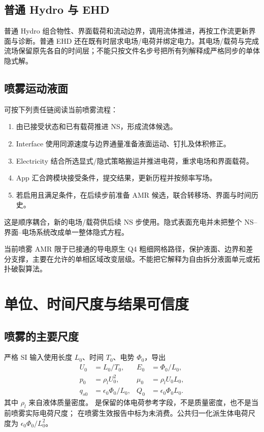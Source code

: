 \documentclass[a4paper,11pt]{article}
\begin{document}
\subsection{普通 Hydro 与 EHD}
普通 Hydro 组合物性、界面载荷和流动边界，调用流体推进，再按工作流更新界面与诊断。普通 EHD 还在既有时层求电场/电荷并绑定电力。其电场/载荷与完成流场保留原先各自的时间层；不能只按文件名步号把所有列解释成严格同步的单体隐式解。

\subsection{喷雾运动液面}
可按下列责任链阅读当前喷雾流程：
\begin{enumerate}
\item 由已接受状态和已有载荷推进 NS，形成流体候选。
\item Interface 使用同源速度与边界通量准备液面运动、钉扎及体积修正。
\item Electricity 结合所选显式/隐式策略搬运并推进电荷，重求电场和界面载荷。
\item App 汇合跨模块接受条件，提交结果，更新历程并按频率写场。
\item 若启用且满足条件，在后续步前准备 AMR 候选，联合转移场、界面与时间历史。
\end{enumerate}
这是顺序耦合，新的电场/载荷供后续 NS 步使用。隐式表面充电并未把整个 NS--界面--电场系统改成单一整体隐式方程。

当前喷雾 AMR 限于已接通的导电原生 Q4 粗细网格路径，保护液面、边界和差分支撑，主要在允许的单相区域改变层级。不能把它解释为自由拆分液面单元或拓扑破裂算法。

\section{单位、时间尺度与结果可信度}
\subsection{喷雾的主要尺度}
严格 SI 输入使用长度 $L_0$、时间 $T_0$、电势 $\Phi_0$，导出
\begin{align}
U_0&=L_0/T_0,&E_0&=\Phi_0/L_0,\\
p_0&=\rho_lU_0^2,&\mu_0&=\rho_lU_0L_0,\\
q_{s0}&=\epsilon_0\Phi_0/L_0,&Q_0&=\epsilon_0\Phi_0L_0.
\end{align}
其中 $\rho_l$ 来自液体质量密度。 是保留的体电荷参考字段，不是质量密度，也不是当前喷雾实际电荷尺度； 在喷雾生效报告中标为未消费。公共归一化派生体电荷尺度为 $\epsilon_0\Phi_0/L_0^2$。
\end{document}

